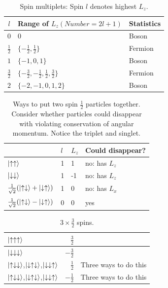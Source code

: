 \documentclass[]{article}
\begin{document}
\begin{table}[H]
	\begin{center}
		\caption{Spin multiplets: Spin $l$ denotes highest $L_z$.}
		\begin{tabular}{|c|l|l|} \hline
		$l$&Range of $L_z (Number=2l+1)$&Statistics\\ \hline
		$0$&$0$& Boson\\ \hline
		$\frac{1}{2}$&$\{-\frac{1}{2},\frac{1}{2}\}$& Fermion\\ \hline
		$1$&$\{-1,0,1\}$&Boson \\ \hline
		$\frac{3}{2}$&$\{-\frac{3}{2},-\frac{1}{2},\frac{1}{2},\frac{3}{2}\}$&Fermion \\ \hline
		$2$&$\{-2,-1,0,1,2\}$&Boson \\ \hline
		\end{tabular}
	\end{center}
\end{table}

\begin{table}[H]
	\begin{center}
		\caption[Ways to put two spin $\frac{1}{2}$ particles together]{Ways to put two spin $\frac{1}{2}$ particles together. Consider whether particles could disappear with violating conservation of angular momentum. Notice the triplet and singlet.} 
		\begin{tabular}{|l|l|l|l|}\hline
			&$l$&$L_z$&Could disappear?\\ \hline
			$\ket{\uparrow\uparrow}$ &1&1&no: has $L_z$\\ \hline
			$\ket{\downarrow\downarrow}$&1&-1&no: has $L_z$ \\ \hline
			$\frac{1}{\sqrt{2}}(\ket{\uparrow\downarrow}+\ket{\downarrow\uparrow})$ &1&0&no: has $L_x$\\ \hline
			$\frac{1}{\sqrt{2}}(\ket{\uparrow\downarrow}-\ket{\downarrow\uparrow})$ &0&0&yes\\ \hline
		\end{tabular}
	\end{center}
\end{table}


\begin{table}[H]
	\begin{center}
		\caption{$3 \times \frac{3}{2}$ spins.}
		\begin{tabular}{|l|r|c|}\hline
			$\ket{\uparrow\uparrow\uparrow}$&$\frac{3}{2}$& \\ \hline
			$\ket{\downarrow\downarrow\downarrow}$&$-\frac{3}{2}$& \\ \hline
			$\ket{\uparrow\downarrow\downarrow}$,$\ket{\downarrow\uparrow\downarrow}$,$\ket{\downarrow\downarrow\uparrow}$&$\frac{1}{2}$&Three ways to do this\\ \hline
			$\ket{\uparrow\downarrow\downarrow}$,$\ket{\downarrow\uparrow\downarrow}$,$\ket{\downarrow\downarrow\uparrow}$&$-\frac{1}{2}$&Three ways to do this\\ \hline
		\end{tabular}
	\end{center}
\end{table}
\end{document}
